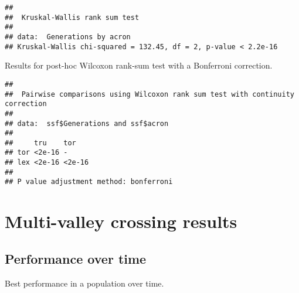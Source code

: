 \documentclass[]{book}
\newenvironment{Shaded}{\begin{snugshade}}{\end{snugshade}}
\newcommand{\CharTok}[1]{\textcolor[rgb]{0.31,0.60,0.02}{#1}}
\newcommand{\CommentTok}[1]{\textcolor[rgb]{0.56,0.35,0.01}{\textit{#1}}}
\newcommand{\DataTypeTok}[1]{\textcolor[rgb]{0.13,0.29,0.53}{#1}}
\newcommand{\KeywordTok}[1]{\textcolor[rgb]{0.13,0.29,0.53}{\textbf{#1}}}
\newcommand{\NormalTok}[1]{#1}
\newcommand{\OperatorTok}[1]{\textcolor[rgb]{0.81,0.36,0.00}{\textbf{#1}}}
\newcommand{\OtherTok}[1]{\textcolor[rgb]{0.56,0.35,0.01}{#1}}
\newcommand{\StringTok}[1]{\textcolor[rgb]{0.31,0.60,0.02}{#1}}
\begin{document}
\begin{verbatim}
## 
##  Kruskal-Wallis rank sum test
## 
## data:  Generations by acron
## Kruskal-Wallis chi-squared = 132.45, df = 2, p-value < 2.2e-16
\end{verbatim}

Results for post-hoc Wilcoxon rank-sum test with a Bonferroni correction.

\begin{Shaded}
\end{Shaded}

\begin{verbatim}
## 
##  Pairwise comparisons using Wilcoxon rank sum test with continuity correction 
## 
## data:  ssf$Generations and ssf$acron 
## 
##     tru    tor   
## tor <2e-16 -     
## lex <2e-16 <2e-16
## 
## P value adjustment method: bonferroni
\end{verbatim}

\hypertarget{multi-valley-crossing-results-1}{%
\section{Multi-valley crossing results}\label{multi-valley-crossing-results-1}}

\hypertarget{performance-over-time-3}{%
\subsection{Performance over time}\label{performance-over-time-3}}

Best performance in a population over time.

\begin{Shaded}
\end{Shaded}
\end{document}
